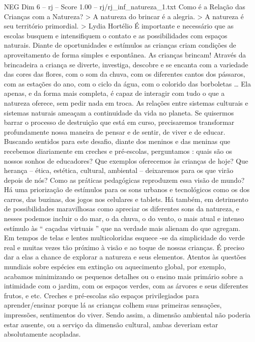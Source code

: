 \begin{textsample}{NEG Dim 6 – rj – Score 1.00 – rj/rj\_inf\_natureza\_1.txt}  \label{ex:f6_neg_007}
Como é a Relação das Crianças com a Natureza? > A natureza do brincar é a alegria. > A natureza é seu território primordial. > Lydia Hortélio É importante e necessário que as escolas busquem e intensifiquem o contato e as possibilidades com espaços naturais.
Diante de oportunidades e estímulos as crianças criam condições de aproveitamento de forma simples e espontânea.
As crianças brincam!
Através da brincadeira a criança se diverte, investiga, descobre e se encanta com a variedade das cores das flores, com o som da chuva, com os diferentes cantos dos pássaros, com as estações do ano, com o ciclo da água, com o colorido das borboletas … Ela apenas, e da forma mais completa, é capaz de interagir com tudo o que a natureza oferece, sem pedir nada em troca.
As relações entre sistemas culturais e sistemas naturais ameaçam a continuidade da vida no planeta.
Se quisermos barrar o processo de destruição que está em curso, precisaremos transformar profundamente nossa maneira de pensar e de sentir, de viver e de educar.
Buscando sentidos para este desafio, diante dos meninos e das meninas que recebemos diariamente em creches e pré-escolas, perguntamos : quais são os nossos sonhos de educadores?
Que exemplos oferecemos às crianças de hoje?
Que herança – ética, estética, cultural, ambiental – deixaremos para os que virão depois de nós?
Como as práticas pedagógicas reproduzem essa visão de mundo?
Há uma priorização de estímulos para os sons urbanos e tecnológicos como os dos carros, das buzinas, dos jogos nos celulares e tablets.
Há também, em detrimento de possibilidades maravilhosas como apreciar os diferentes sons da natureza, e nesses podemos incluir o do mar, o da chuva, o do vento, o mais atual e intenso estímulo às “ caçadas virtuais ” que na verdade mais alienam do que agregam.
Em tempos de telas e lentes multicoloridas esquece -se da simplicidade do verde real e muitas vezes tão próximo à visão e ao toque de nossas crianças.
É preciso dar a elas a chance de explorar a natureza e seus elementos.
Atentos às questões mundiais sobre espécies em extinção ou aquecimento global, por exemplo, acabamos minimizando os pequenos detalhes ou o ensino mais primário sobre a intimidade com o jardim, com os espaços verdes, com as árvores e seus diferentes frutos, e etc.
Creches e pré-escolas são espaços privilegiados para aprender/ensinar porque lá as crianças colhem suas primeiras sensações, impressões, sentimentos do viver.
Sendo assim, a dimensão ambiental não poderia estar ausente, ou a serviço da dimensão cultural, ambas deveriam estar absolutamente acopladas.

\end{textsample}
